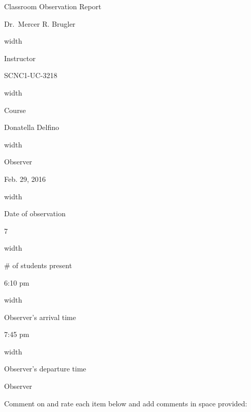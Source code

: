\documentclass[11pt,dvipsnames]{article}
\newcommand*{\linesep}[1]{%
	\par\nobreak
	\vskip 3pt \leaders\vrule width #1\vskip 0.81pt
	\nobreak
}
\begin{document}
	\begin{center}
		{\Large Classroom Observation Report}
	\end{center}
\begin{minipage}{0.35\textwidth}
		Dr.~Mercer R. Brugler \par
		\linesep{\textwidth}
		Instructor
	\end{minipage}
\hspace{0.2\textwidth}
	\begin{minipage}{0.35\textwidth}
			SCNC1-UC-3218 \par
			\linesep{\textwidth}
			Course
		\end{minipage}
		
\vskip 1cm
		
\begin{minipage}{0.35\textwidth}
	Donatella Delfino \par
	\linesep{\textwidth}
	Observer
\end{minipage}
\hspace{0.2\textwidth}
\begin{minipage}{0.35\textwidth}
	Feb. 29, 2016 \par
	\linesep{\textwidth}
	Date of observation
\end{minipage}

\vskip 1cm

\begin{minipage}{0.35\textwidth}
	7 \par
	\linesep{\textwidth}
	\# of students present
\end{minipage}

\vskip 1cm

\begin{minipage}{0.35\textwidth}
	6:10 pm \par
	\linesep{\textwidth}
	Observer's arrival time
\end{minipage}
\hspace{0.2\textwidth}
\begin{minipage}{0.35\textwidth}
	7:45 pm \par
	\linesep{\textwidth}
	Observer's departure time
\end{minipage}

\vskip 1cm
{\large Observer}

Comment on and rate each item below and add comments in space provided:
\vskip 0.5cm

		
\end{document}
